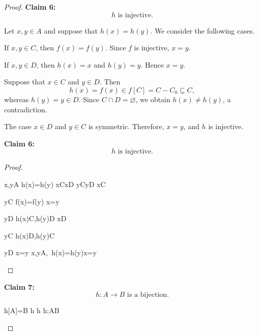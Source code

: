\documentclass[10pt,a4paper]{book}
\let\emptyset\varnothing
\begin{document}
\begin{proof}
\textbf{Claim 6:}
\[
    h \text{ is injective}.
\]

    Let $x,y\in A$ and suppose that $h(x)=h(y)$.
    We consider the following cases.

    If $x,y\in C$, then $f(x)=f(y)$.
    Since $f$ is injective, $x=y$.

    If $x,y\in D$, then $h(x)=x$ and $h(y)=y$.
    Hence $x=y$.

    Suppose that $x\in C$ and $y\in D$. Then
    \[
        h(x)=f(x)\in f[C]=C - C_0\subseteq C,
    \]
    whereas $h(y)=y\in D$. Since $C\cap D=\emptyset$,
    we obtain $h(x)\neq h(y)$, a contradiction.

    The case $x\in D$ and $y\in C$ is symmetric.
    Therefore, $x=y$, and $h$ is injective.

\textbf{Claim 6:}
\[
    h \text{ is injective}.
\]

\begin{proof}
    \begin{fitchproof}[arrayenv=tabular]
        \open
             {x,y\in A}
             {h(x)=h(y)}
             {x\in C\lor x\in D} 
             {y\in C\lor y\in D} 
                 {x\in C}

                     {y\in C}
                     {f(x)=f(y)} 
                     {x=y} 

                     {y\in D}
                     {h(x)\in C,\quad h(y)\in D} 
                     {\bot} \by{$C\cap D=\emptyset$ and 2}{10}
                \close
                 {x\in D}

                     {y\in C}
                     {h(x)\in D,\quad h(y)\in C} 
                     {\bot} \by{$C\cap D=\emptyset$ and 2}{14}

                     {y\in D}
                     {x=y} 
                \close
            \close
        \close
         {\forall x,y\in A,\ h(x)=h(y)\to x=y}
    \end{fitchproof}
\end{proof}

\textbf{Claim 7:}
\[
    h:A\to B \text{ is a bijection}.
\]


    \begin{fitchproof}[arrayenv=tabular]
         {h[A]=B} 
         {h } 
         {h } 
         {h:A\to B } 
    \end{fitchproof}

\end{proof}
\end{document}
